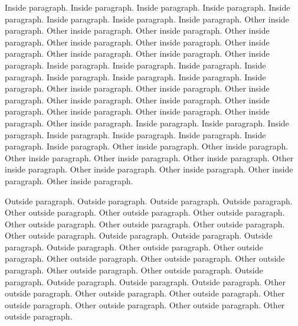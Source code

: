 \documentclass{scrartcl}
\begin{document}
\begin{pairs}
\begin{Leftside}
                Inside paragraph. Inside paragraph. Inside paragraph. Inside paragraph. Inside paragraph. Inside paragraph. Inside paragraph. Inside paragraph.
            \pend
            \pstart
                Other inside paragraph.  Other inside paragraph.  Other inside paragraph.  Other inside paragraph.  Other inside paragraph.  Other inside paragraph.  Other inside paragraph.  Other inside paragraph.  Other inside paragraph.  Other inside paragraph.
            \pend
                        \pstart
                Inside paragraph. Inside paragraph. Inside paragraph. Inside paragraph. Inside paragraph. Inside paragraph. Inside paragraph. Inside paragraph.
            \pend
            \pstart
                Other inside paragraph.  Other inside paragraph.  Other inside paragraph.  Other inside paragraph.  Other inside paragraph.  Other inside paragraph.  Other inside paragraph.  Other inside paragraph.  Other inside paragraph.  Other inside paragraph.
            \pend
                        \pstart
                Inside paragraph. Inside paragraph. Inside paragraph. Inside paragraph. Inside paragraph. Inside paragraph. Inside paragraph. Inside paragraph.
            \pend
            \pstart
                Other inside paragraph.  Other inside paragraph.  Other inside paragraph.  Other inside paragraph.  Other inside paragraph.  Other inside paragraph.  Other inside paragraph.  Other inside paragraph.  Other inside paragraph.  Other inside paragraph.
            \pend
        \endnumbering
    \end{Leftside}
    \begin{Rightside}
        \beginnumbering
            \pstart
                Outside paragraph. Outside paragraph. Outside paragraph. Outside paragraph.
            \pend
            \pstart
                Other outside paragraph. Other outside paragraph. Other outside paragraph. Other outside paragraph. Other outside paragraph. Other outside paragraph. Other outside paragraph.
            \pend
                        \pstart
                Outside paragraph. Outside paragraph. Outside paragraph. Outside paragraph.
            \pend
            \pstart
                Other outside paragraph. Other outside paragraph. Other outside paragraph. Other outside paragraph. Other outside paragraph. Other outside paragraph. Other outside paragraph.
            \pend
                        \pstart
                Outside paragraph. Outside paragraph. Outside paragraph. Outside paragraph.
            \pend
            \pstart
                Other outside paragraph. Other outside paragraph. Other outside paragraph. Other outside paragraph. Other outside paragraph. Other outside paragraph. Other outside paragraph.

\end{Rightside}
\end{pairs}
\end{document}
